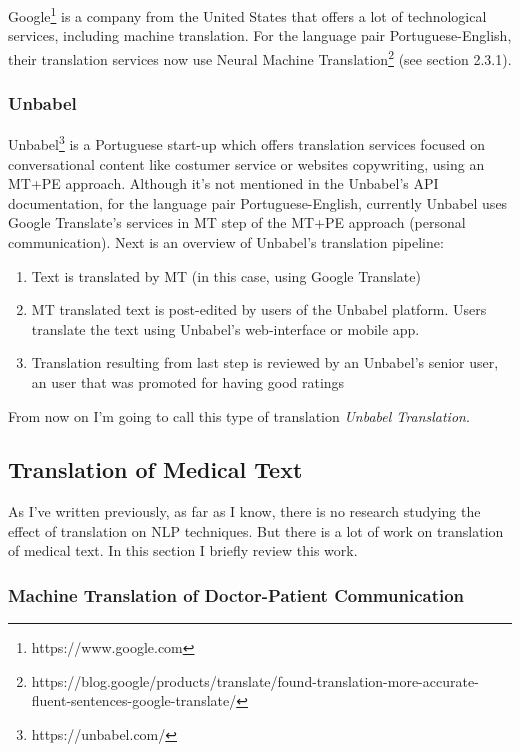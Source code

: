 Google\footnote{https://www.google.com} is a company from the United States that offers a lot of technological services, including machine translation. For the language pair Portuguese-English, their translation services now use Neural Machine Translation\footnote{https://blog.google/products/translate/found-translation-more-accurate-fluent-sentences-google-translate/} (see section 2.3.1).

\subsubsection{Unbabel}

Unbabel\footnote{https://unbabel.com/} is a Portuguese start-up which offers translation services focused on conversational content like costumer service or websites copywriting, using an MT+PE approach. Although it's not mentioned in the Unbabel's API documentation, for the language pair Portuguese-English, currently Unbabel uses Google Translate's services in MT step of the MT+PE approach (personal communication). Next is an overview of Unbabel's translation pipeline:

\begin{enumerate}
\item Text is translated by MT (in this case, using Google Translate)
\item MT translated text is post-edited by users of the Unbabel platform. Users translate the text using Unbabel's web-interface or mobile app. 
\item Translation resulting from last step is reviewed by an Unbabel's senior user, an user that was promoted for having good ratings
\end{enumerate}

From now on I'm going to call this type of translation \textit{Unbabel Translation}.
 

\subsection{Translation of Medical Text}

As I've written previously, as far as I know, there is no research studying the effect of translation on NLP techniques. But there is a lot of work on translation of medical text. In this section I briefly review this work.

\subsubsection{Machine Translation of Doctor-Patient Communication}

